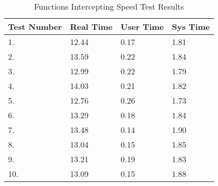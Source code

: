\renewcommand{\arraystretch}{1.5}

\begin{table}
\caption{Functions Intercepting Speed Test Results}
\label{tb:intres}
\begin{center}


\begin{tabular}{| l | l | l | l |}
\hline
\textbf{Test Number} & \textbf{Real Time} & \textbf{User Time} & \textbf{Sys Time} \\ \hline
1. & 12.44	& 0.17	&	1.81		\\ \hline
2. & 13.59 		& 0.22 	&	1.84	\\ \hline
3. & 12.99 		& 0.22 	&	1.79	\\ \hline
4. & 14.03		& 0.21 	& 1.82			\\ \hline
5. & 12.76  	& 0.26 	& 1.73				\\ \hline
6. & 13.29 & 0.18 & 1.84 \\ \hline
7. & 13.48    & 0.14 & 1.90 \\ \hline
8. & 13.04  & 0.15 & 1.85  \\ \hline
9. & 13.21  & 0.19 & 1.83 \\ \hline
10. & 13.09    & 0.15  & 1.88 \\ \hline
\hline
\end{tabular}
\end{center}
\end{table}
\vspace{3em}
